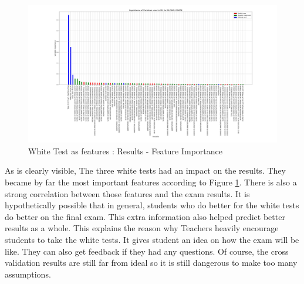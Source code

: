 \documentclass[a4paper,11pt]{report}
\numberwithin{figure}{chapter} %
\begin{document}
      \begin{figure}[H]
      \centering
      \includegraphics[width=.95\linewidth]{plots/test1_var_importance_GLOBAL_GRADE_2018-05-17_10_12_18.png}
      \caption{White Test as features : Results - Feature Importance}
      \label{fig:test1_2}
      \end{figure}
    As is clearly visible, The three white tests had an impact on the results.
    They became by far the most important features according to Figure \ref{fig:test1_2}.
    There is also a strong correlation between those features and the exam results.
    It is hypothetically possible that in general, students who do better for the white tests do better on the final exam.
    This extra information also helped predict better results as a whole.
    This explains the reason why Teachers heavily encourage students to take the white tests.
    It gives student an idea on how the exam will be like.
    They can also get feedback if they had any questions.
    Of course, the cross validation results are still far from ideal so it is still dangerous to make too many assumptions.\\
\end{document}
